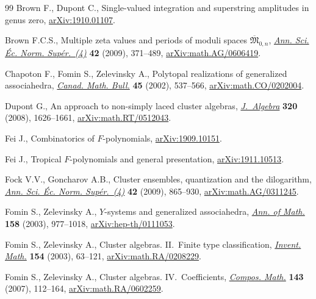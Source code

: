 \begin{thebibliography}{99}
Brown F., Dupont C., Single-valued integration and superstring amplitudes in
 genus zero, \href{https://arxiv.org/abs/1910.01107}{arXiv:1910.01107}.

Brown F.C.S., Multiple zeta values and periods of moduli spaces
 {$\overline{\mathfrak M}_{0,n}$}, \href{https://doi.org/10.24033/asens.2099}{\textit{Ann. Sci. \'Ec. Norm. Sup\'er.~(4)}}
 \textbf{42} (2009), 371--489, \href{https://arxiv.org/abs/math.AG/0606419}{arXiv:math.AG/0606419}.

Chapoton F., Fomin S., Zelevinsky A., Polytopal realizations of generalized
 associahedra, \href{https://doi.org/10.4153/CMB-2002-054-1}{\textit{Canad. Math. Bull.}} \textbf{45} (2002), 537--566, \href{https://arxiv.org/abs/math.CO/0202004}{arXiv:math.CO/0202004}.

Dupont G., An approach to non-simply laced cluster algebras,
 \href{https://doi.org/10.1016/j.jalgebra.2008.03.018}{\textit{J.~Algebra}} \textbf{320} (2008), 1626--1661,
 \href{https://arxiv.org/abs/math.RT/0512043}{arXiv:math.RT/0512043}.

Fei J., Combinatorics of {$F$}-polynomials, \href{https://arxiv.org/abs/1909.10151}{arXiv:1909.10151}.

Fei J., Tropical {$F$}-polynomials and general presentation,
 \href{https://arxiv.org/abs/1911.10513}{arXiv:1911.10513}.

Fock V.V., Goncharov A.B., Cluster ensembles, quantization and the dilogarithm,
 \href{https://doi.org/10.24033/asens.2112}{\textit{Ann. Sci. \'Ec. Norm. Sup\'er.~(4)}} \textbf{42} (2009), 865--930,
 \href{https://arxiv.org/abs/math.AG/0311245}{arXiv:math.AG/0311245}.

Fomin S., Zelevinsky A., {$Y$}-systems and generalized associahedra,
 \href{https://doi.org/10.4007/annals.2003.158.977}{\textit{Ann. of Math.}} \textbf{158} (2003), 977--1018,
 \href{https://arxiv.org/abs/hep-th/0111053}{arXiv:hep-th/0111053}.

Fomin S., Zelevinsky A., Cluster algebras. {II}.~{F}inite type classification,
 \href{https://doi.org/10.1007/s00222-003-0302-y}{\textit{Invent. Math.}} \textbf{154} (2003), 63--121,
 \href{https://arxiv.org/abs/math.RA/0208229}{arXiv:math.RA/0208229}.

Fomin S., Zelevinsky A., Cluster algebras. {IV}.~{C}oefficients,
 \href{https://doi.org/10.1112/S0010437X06002521}{\textit{Compos. Math.}} \textbf{143} (2007), 112--164,
 \href{https://arxiv.org/abs/math.RA/0602259}{arXiv:math.RA/0602259}.


\end{thebibliography}
